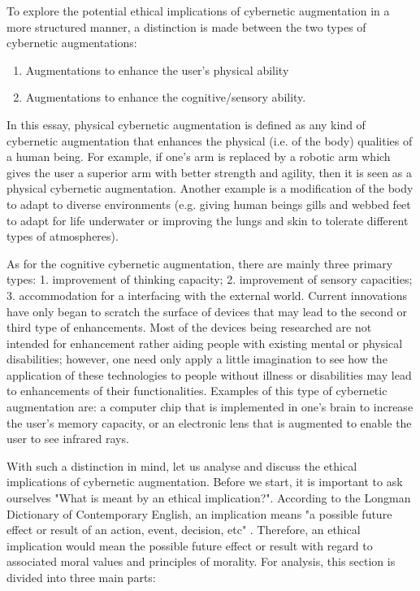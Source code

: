 To explore the potential ethical implications of cybernetic augmentation in a more structured manner, a distinction is made between the two types of cybernetic augmentations: 
\begin{enumerate}
	\item Augmentations to enhance the user's physical ability
	\item Augmentations to enhance the cognitive/sensory ability.
\end{enumerate}

In this essay, physical cybernetic augmentation is defined as any kind of cybernetic augmentation that enhances the physical (i.e. of the body) qualities of a human being. For example, if one's arm is replaced by a robotic arm which gives the user a superior arm with better strength and agility, then it is seen as a physical cybernetic augmentation. Another example is a modification of the body to adapt to diverse environments (e.g. giving human beings gills and webbed feet to adapt for life underwater or improving the lungs and skin to tolerate different types of atmospheres).

As for the cognitive cybernetic augmentation, there are mainly three primary types: 1. improvement of thinking capacity; 2. improvement of sensory capacities; 3. accommodation for a interfacing with the external world. Current innovations have only began to scratch the surface of devices that may lead to the second or third type of enhancements. Most of the devices being researched are not intended for enhancement rather aiding people with existing mental or physical disabilities; however, one need only apply a little imagination to see how the application of these technologies to people without illness or disabilities may lead to enhancements of their functionalities. Examples of this type of cybernetic augmentation are: a computer chip that is implemented in one's brain to increase the user's memory capacity, or an electronic lens that is augmented to enable the user to see infrared rays.

With such a distinction in mind, let us analyse and discuss the ethical implications of cybernetic augmentation. Before we start, it is important to ask ourselves "What is meant by an ethical implication?". According to the Longman Dictionary of Contemporary English, an implication means "a possible future effect or result of an action, event, decision, etc" \cite{Longman_dic}. Therefore, an ethical implication would mean the possible future effect or result with regard to associated moral values and principles of morality. For analysis, this section is divided into three main parts: 

